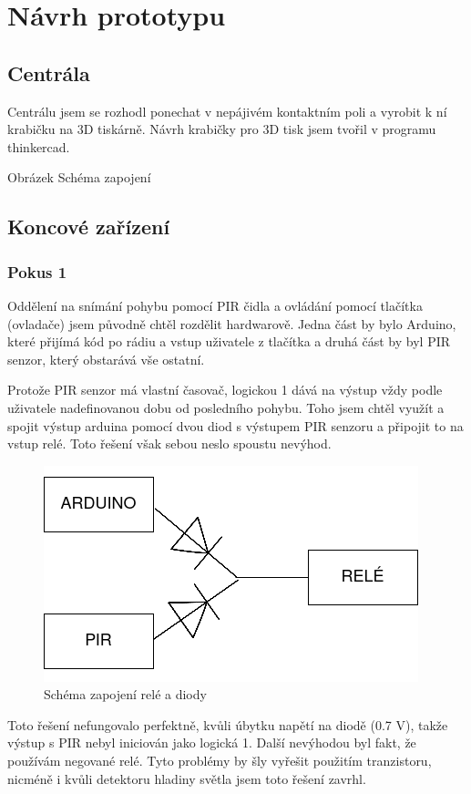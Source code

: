 \documentclass[11pt,a4paper,twoside,openright]{report}
\begin{document}
\section{Návrh prototypu}
\subsection{Centrála}

Centrálu jsem se rozhodl ponechat v nepájivém kontaktním poli a vyrobit k ní krabičku na 3D tiskárně. Návrh krabičky pro 3D tisk jsem tvořil v programu thinkercad. 

Obrázek Schéma zapojení

\subsection{Koncové zařízení}

\subsubsection{Pokus 1}

Oddělení na snímání pohybu pomocí PIR čidla a ovládání pomocí tlačítka (ovladače) jsem původně chtěl rozdělit hardwarově. Jedna část by bylo Arduino, které přijímá kód po rádiu a vstup uživatele z tlačítka a druhá část by byl PIR senzor, který obstarává vše ostatní.


Protože PIR senzor má vlastní časovač, logickou 1 dává na výstup vždy podle uživatele nadefinovanou dobu od posledního pohybu. Toho jsem chtěl využít a spojit výstup arduina pomocí dvou diod s výstupem PIR senzoru a připojit to na vstup relé. Toto řešení však sebou neslo spoustu nevýhod. 

\begin{figure}[htb]
\centering
\includegraphics[width=0.5\hsize]{img/zapojeni_rele.png}
\caption{Schéma zapojení relé a diody}\end{figure}

Toto řešení nefungovalo perfektně, kvůli úbytku napětí na diodě (0.7 V), takže výstup s PIR nebyl iniciován jako logická 1. Další nevýhodou byl fakt, že používám negované relé. Tyto problémy by šly vyřešit použitím tranzistoru, nicméně i kvůli detektoru hladiny světla jsem toto řešení zavrhl.
\end{document}
